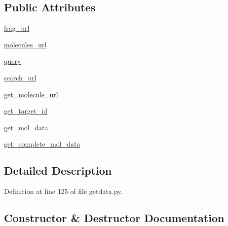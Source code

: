 \subsection*{Public Attributes}
\begin{DoxyCompactItemize}
\item 
\hyperlink{classfragalysis__api_1_1xcextracter_1_1getdata_1_1_get_molecules_data_a3a27004f4ee3a723e84d65065f0a1c6c}{frag\+\_\+url}
\item 
\hyperlink{classfragalysis__api_1_1xcextracter_1_1getdata_1_1_get_molecules_data_a01793eb7293e0ae72bbf87afc2105b99}{molecules\+\_\+url}
\item 
\hyperlink{classfragalysis__api_1_1xcextracter_1_1getdata_1_1_get_molecules_data_a7c5fd4724cd4758048ae1a6974341ffa}{query}
\item 
\hyperlink{classfragalysis__api_1_1xcextracter_1_1getdata_1_1_get_molecules_data_ac2b899060aa81350219dcca84a0393e9}{search\+\_\+url}
\item 
\hyperlink{classfragalysis__api_1_1xcextracter_1_1getdata_1_1_get_molecules_data_acc15aef3cffb79b292088e22c876f300}{get\+\_\+molecule\+\_\+url}
\item 
\hyperlink{classfragalysis__api_1_1xcextracter_1_1getdata_1_1_get_molecules_data_a488df8e18c47c75a3409932a19daaa0f}{get\+\_\+target\+\_\+id}
\item 
\hyperlink{classfragalysis__api_1_1xcextracter_1_1getdata_1_1_get_molecules_data_a4f1564c52821f30324558b7d4205752b}{get\+\_\+mol\+\_\+data}
\item 
\hyperlink{classfragalysis__api_1_1xcextracter_1_1getdata_1_1_get_molecules_data_a10d64bb77ee5a46626b7ee644a48c818}{get\+\_\+complete\+\_\+mol\+\_\+data}
\end{DoxyCompactItemize}


\subsection{Detailed Description}


Definition at line 125 of file getdata.\+py.



\subsection{Constructor \& Destructor Documentation}
\mbox{\label{classfragalysis__api_1_1xcextracter_1_1getdata_1_1_get_molecules_data_a11e4a33bfbb0ff558ef33a0e8a46c76b}} 
